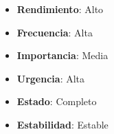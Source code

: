 \documentclass[letterpaper,10pt,spanish]{sphinxmanual}
\begin{document}
\begin{itemize}
\begin{itemize}
\end{itemize}

\item {} 
\textbf{Rendimiento}: Alto

\item {} 
\textbf{Frecuencia}: Alta

\item {} 
\textbf{Importancia}: Media

\item {} 
\textbf{Urgencia}: Alta

\item {} 
\textbf{Estado}: Completo

\item {} 
\textbf{Estabilidad}: Estable

\end{itemize}
\end{document}
